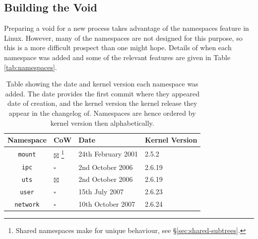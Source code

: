 \documentclass[sigplan]{acmart}
\begin{document}
\subsection{Building the Void}

Preparing a void for a new process takes advantage of the namespaces feature in Linux. However, many of the namespaces are not designed for this purpose, so this is a more difficult prospect than one might hope. Details of when each namespace was added and some of the relevant features are given in Table \ref{tab:namespaces}.

\begin{table}
    \caption{Table showing the date and kernel version each namespace was added. The date provides the first commit where they appeared date of creation, and the kernel version the kernel release they appear in the changelog of. Namespaces are hence ordered by kernel version then alphabetically.}

    \begin{minipage}{\textwidth}
    \begin{center}
    \begin{tabular}{c|l|l|l}
        Namespace & CoW & Date & Kernel Version \\ \hline

        \texttt{mount}
            & $\boxtimes$ \footnote{Shared namespaces make for unique behaviour, see §\ref{sec:shared-subtrees}.}
            & 24th February 2001 \citep{viro_patchcft_2001}
            & 2.5.2 \citep{torvalds_linux_2002} \\
            
        \texttt{ipc}
            & $\square$
            & 2nd October 2006 \citep{korotaev_patch_2006}
            & 2.6.19 \citep{noauthor_linux_2006} \\

        \texttt{uts}
            & $\boxtimes$
            & 2nd October 2006 \citep{hallyn_patch_2006}
            & 2.6.19 \citep{noauthor_linux_2006} \\
            
        \texttt{user}
            & $\square$
            & 15th July 2007 \citep{le_goater_user_2007}
            & 2.6.23 \citep{noauthor_linux_2007} \\
            
        \texttt{network}
            & $\square$
            & 10th October 2007 \citep{biederman_net_2007}
            & 2.6.24 \citep{noauthor_linux_2008} \\
            

\end{tabular}
\end{center}
\end{minipage}
\end{table}
\end{document}
